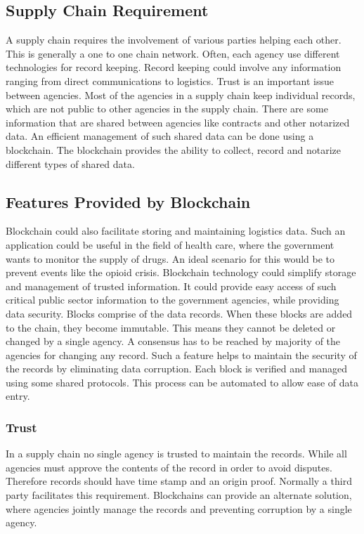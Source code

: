 \documentclass[sigconf]{acmart}
\begin{document}
\subsection{Supply Chain Requirement}
A supply chain requires the involvement of various parties helping each other. This is generally a one to one chain network. Often, each agency use different technologies for record keeping. Record keeping could involve any information ranging from direct communications to logistics. Trust is an important issue between agencies. Most of the agencies in a supply chain keep individual records, which are not public to other agencies in the supply chain. There are some information that are shared between agencies like contracts and other notarized data. An efficient management of such  shared data can be done using a blockchain. The blockchain provides the ability to collect, record and notarize different types of shared data\cite{arbc1}. 

\subsection{Features Provided by Blockchain}
Blockchain could also facilitate storing and maintaining logistics data. Such an application could be useful in the field of health care, where the government wants to monitor the supply of drugs. An ideal scenario for this would be to prevent events like the opioid crisis. Blockchain technology could simplify storage and management of trusted information. It could provide easy access of such critical public sector information to the government agencies, while providing data security\cite{arbc2}. Blocks comprise of the data records. When these blocks are added to the chain, they become immutable. This means they cannot be deleted or changed by a single agency\cite{arbc2}. A consensus has to be reached by majority of the agencies for changing any record. Such a feature helps to maintain the security of the records by eliminating data corruption. Each block is verified and managed using some shared protocols. This process can be automated to allow ease of data entry.

\subsubsection{Trust}
In a supply chain no single agency is trusted to maintain the records. While all agencies must approve the contents of the record in order to avoid disputes. Therefore records should have time stamp and an origin proof. Normally a third party facilitates this requirement. Blockchains can provide an alternate solution, where agencies jointly manage the records and preventing corruption by a single agency\cite{arbc1}. 
\end{document}
